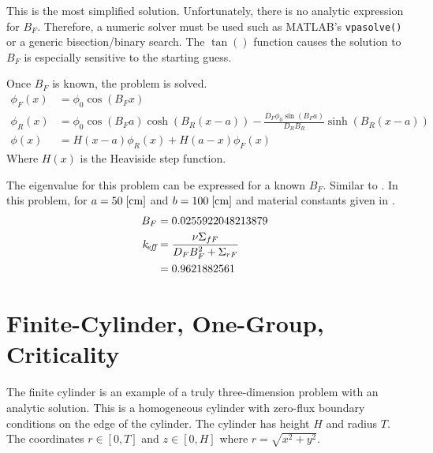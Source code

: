   This is the most simplified solution. Unfortunately, there is no analytic
  expression for $B_F$. Therefore, a numeric solver must be used such as 
  MATLAB's \texttt{vpasolve()} or a generic bisection/binary search. The $\tan()$ 
  function causes the solution to $B_F$ is especially sensitive to the starting
  guess.
  
  Once $B_F$ is known, the problem is solved.
  \begin{align}
    \phi_F(x) &= \phi_0 \cos(B_F x)\\
    \phi_R(x) &= \phi_0 \cos(B_F a) \cosh(B_R (x-a)) 
      - \frac{D_F \phi_0 \sin(B_F a)}{D_R B_R} \sinh(B_R (x-a))\\
    \label{eq:analytic_2reg}
    \phi(x) &= H(x-a)\phi_R(x) + H(a-x)\phi_F(x)
  \end{align}
  Where $H(x)$ is the Heaviside step function.  
  
  The eigenvalue for this problem can be expressed for a known $B_F$. Similar 
  to . In this problem, for $a=50 \;\text{[{cm}]}$ and
  $b=100 \;\text{[{cm}]}$ and material constants given in .
  \begin{align}
    B_F &= 0.0255922048213879 \\
    k_{\!\mbox{\scriptsize \em eff}} &= \frac{\nu\Sigma_{fF}}{D_F B_F^2 + \Sigma_{rF}} \\
    &= 0.9621882561
  \end{align}
\section{Finite-Cylinder, One-Group, Criticality}
  \label{sec:deriv_finite_cyl}
  The finite cylinder is an example of a truly three-dimension problem with
  an analytic solution. This is a homogeneous cylinder with zero-flux boundary
  conditions on the edge of the cylinder. The cylinder has height $H$ and 
  radius $T$. The coordinates $r\in[0,T]$ and $z\in[0,H]$ where 
  $r=\sqrt{x^2+y^2}$.
  
